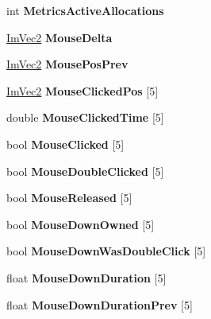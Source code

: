 \begin{DoxyCompactItemize}
int {\bfseries Metrics\+Active\+Allocations}
\item 
\mbox{\label{structImGuiIO_a5b5cc0c171104337e3e7e13a8f7b0938}} 
\hyperlink{structImVec2}{Im\+Vec2} {\bfseries Mouse\+Delta}
\item 
\mbox{\label{structImGuiIO_a0fa6601a709eb9e34460e6abc7e77ad7}} 
\hyperlink{structImVec2}{Im\+Vec2} {\bfseries Mouse\+Pos\+Prev}
\item 
\mbox{\label{structImGuiIO_a23c9c6c48a51774fee36b7f0bb75d331}} 
\hyperlink{structImVec2}{Im\+Vec2} {\bfseries Mouse\+Clicked\+Pos} \mbox{[}5\mbox{]}
\item 
\mbox{\label{structImGuiIO_afc5a5a5250fdee3c558f45c4f0268308}} 
double {\bfseries Mouse\+Clicked\+Time} \mbox{[}5\mbox{]}
\item 
\mbox{\label{structImGuiIO_a8655587202ff9001e5b0ccc6ade42d93}} 
bool {\bfseries Mouse\+Clicked} \mbox{[}5\mbox{]}
\item 
\mbox{\label{structImGuiIO_a8bc01048733dc554de3d03f40f57b9ca}} 
bool {\bfseries Mouse\+Double\+Clicked} \mbox{[}5\mbox{]}
\item 
\mbox{\label{structImGuiIO_a3a2e7d52289eecfdbe8571e034e41b53}} 
bool {\bfseries Mouse\+Released} \mbox{[}5\mbox{]}
\item 
\mbox{\label{structImGuiIO_a682f98d817f99058136cb47cf8a9bcc3}} 
bool {\bfseries Mouse\+Down\+Owned} \mbox{[}5\mbox{]}
\item 
\mbox{\label{structImGuiIO_a62ee87c8a52d2a26f8120bad1e3ceaf3}} 
bool {\bfseries Mouse\+Down\+Was\+Double\+Click} \mbox{[}5\mbox{]}
\item 
\mbox{\label{structImGuiIO_ab464bf317051bbdf1c93ab36802fe3b7}} 
float {\bfseries Mouse\+Down\+Duration} \mbox{[}5\mbox{]}
\item 
\mbox{\label{structImGuiIO_a59d19cf7ad831e57ce15f90295871881}} 
float {\bfseries Mouse\+Down\+Duration\+Prev} \mbox{[}5\mbox{]}

\end{DoxyCompactItemize}
